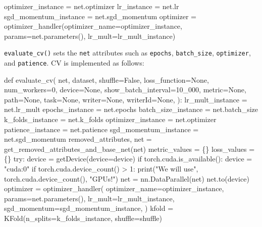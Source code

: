 \documentclass[
  letterpaper,
  DIV=11,
  numbers=noendperiod]{scrreprt}
\newenvironment{Shaded}{\begin{snugshade}}{\end{snugshade}}
\newcommand{\NormalTok}[1]{\textcolor[rgb]{0.00,0.23,0.31}{#1}}
\begin{document}
\begin{Shaded}
\begin{Highlighting}[]
\NormalTok{optimizer\_instance = net.optimizer}
\NormalTok{lr\_instance = net.lr}
\NormalTok{sgd\_momentum\_instance = net.sgd\_momentum}
\NormalTok{optimizer = optimizer\_handler(optimizer\_name=optimizer\_instance,}
\NormalTok{     params=net.parameters(), lr\_mult=lr\_mult\_instance)}
\end{Highlighting}
\end{Shaded}

\texttt{evaluate\_cv()} sets the \texttt{net} attributes such as
\texttt{epochs}, \texttt{batch\_size}, \texttt{optimizer}, and
\texttt{patience}. CV is implemented as follows:

\begin{Shaded}
\begin{Highlighting}[]
\NormalTok{def evaluate\_cv(}
\NormalTok{    net,}
\NormalTok{    dataset,}
\NormalTok{    shuffle=False,}
\NormalTok{    loss\_function=None,}
\NormalTok{    num\_workers=0,}
\NormalTok{    device=None,}
\NormalTok{    show\_batch\_interval=10\_000,}
\NormalTok{    metric=None,}
\NormalTok{    path=None,}
\NormalTok{    task=None,}
\NormalTok{    writer=None,}
\NormalTok{    writerId=None,}
\NormalTok{):}
\NormalTok{    lr\_mult\_instance = net.lr\_mult}
\NormalTok{    epochs\_instance = net.epochs}
\NormalTok{    batch\_size\_instance = net.batch\_size}
\NormalTok{    k\_folds\_instance = net.k\_folds}
\NormalTok{    optimizer\_instance = net.optimizer}
\NormalTok{    patience\_instance = net.patience}
\NormalTok{    sgd\_momentum\_instance = net.sgd\_momentum}
\NormalTok{    removed\_attributes, net = get\_removed\_attributes\_and\_base\_net(net)}
\NormalTok{    metric\_values = \{\}}
\NormalTok{    loss\_values = \{\}}
\NormalTok{    try:}
\NormalTok{        device = getDevice(device=device)}
\NormalTok{        if torch.cuda.is\_available():}
\NormalTok{            device = "cuda:0"}
\NormalTok{            if torch.cuda.device\_count() \textgreater{} 1:}
\NormalTok{                print("We will use", torch.cuda.device\_count(), "GPUs!")}
\NormalTok{                net = nn.DataParallel(net)}
\NormalTok{        net.to(device)}
\NormalTok{        optimizer = optimizer\_handler(}
\NormalTok{            optimizer\_name=optimizer\_instance,}
\NormalTok{            params=net.parameters(),}
\NormalTok{            lr\_mult=lr\_mult\_instance,}
\NormalTok{            sgd\_momentum=sgd\_momentum\_instance,}
\NormalTok{        )}
\NormalTok{        kfold = KFold(n\_splits=k\_folds\_instance, shuffle=shuffle)}

\end{Highlighting}
\end{Shaded}
\end{document}
